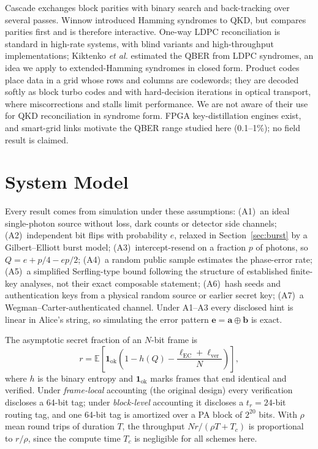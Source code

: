 \documentclass[conference]{IEEEtran}
\begin{document}
Cascade exchanges block parities with binary search and back-tracking over several passes. Winnow introduced Hamming syndromes to QKD, but compares parities first and is therefore interactive. One-way LDPC reconciliation is standard in high-rate systems, with blind variants and high-throughput implementations; Kiktenko \textit{et al.} estimated the QBER from LDPC syndromes, an idea we apply to extended-Hamming syndromes in closed form. Product codes place data in a grid whose rows and columns are codewords; they are decoded softly as block turbo codes and with hard-decision iterations in optical transport, where miscorrections and stalls limit performance. We are not aware of their use for QKD reconciliation in syndrome form. FPGA key-distillation engines exist, and smart-grid links motivate the QBER range studied here (0.1--1\%); no field result is claimed.

\section{System Model}\label{sec:model}
Every result comes from simulation under these assumptions: (A1)~an ideal single-photon source without loss, dark counts or detector side channels; (A2)~independent bit flips with probability $e$, relaxed in Section~\ref{sec:burst} by a Gilbert--Elliott burst model; (A3)~intercept-resend on a fraction $p$ of photons, so $Q=e+p/4-ep/2$; (A4)~a random public sample estimates the phase-error rate; (A5)~a simplified Serfling-type bound following the structure of established finite-key analyses, not their exact composable statement; (A6)~hash seeds and authentication keys from a physical random source or earlier secret key; (A7)~a Wegman--Carter-authenticated channel. Under A1--A3 every disclosed hint is linear in Alice's string, so simulating the error pattern $\mathbf{e}=\mathbf{a}\oplus\mathbf{b}$ is exact.

The asymptotic secret fraction of an $N$-bit frame is
\begin{equation}
r=\mathbb{E}\!\left[\mathbf{1}_{\mathrm{ok}}\left(1-h(Q)-\frac{\ell_{\mathrm{EC}}+\ell_{\mathrm{ver}}}{N}\right)\right],
\label{eq:r}
\end{equation}
where $h$ is the binary entropy and $\mathbf{1}_{\mathrm{ok}}$ marks frames that end identical and verified. Under \emph{frame-local} accounting (the original design) every verification discloses a 64-bit tag; under \emph{block-level} accounting it discloses a $t_r=24$-bit routing tag, and one 64-bit tag is amortized over a PA block of $2^{20}$ bits. With $\rho$ mean round trips of duration $T$, the throughput $Nr/(\rho T+T_c)$ is proportional to $r/\rho$, since the compute time $T_c$ is negligible for all schemes here.
\end{document}

